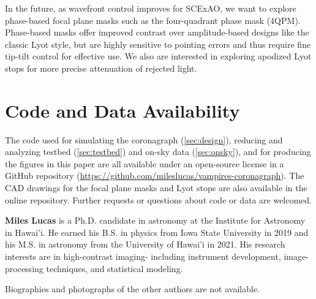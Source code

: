 \documentclass[12pt]{spieman}  %
\begin{document}
\begin{spacing}{2}
In the future, as wavefront control improves for SCExAO, we want to explore phase-based focal plane masks such as the four-quadrant phase mask (4QPM)\cite{rouanFourQuadrantPhase2007}. Phase-based masks offer improved contrast over amplitude-based designs like the classic Lyot style, but are highly sensitive to pointing errors and thus require fine tip-tilt control for effective use\cite{huby2017}. We also are interested in exploring apodized Lyot stops for more precise attenuation of rejected light.

\section*{Code and Data Availability}\label{sec:code}

The code used for simulating the coronagraph (\autoref{sec:design}), reducing and analyzing testbed (\autoref{sec:testbed}) and on-sky data (\autoref{sec:onsky}), and for producing the figures in this paper are all available under an open-source license in a GitHub repository (\url{https://github.com/mileslucas/vampires-coronagraph}). The CAD drawings for the focal plane masks and Lyot stops are also available in the online repository. Further requests or questions about code or data are welcomed.




\vspace{2ex}\noindent\textbf{Miles Lucas} is a Ph.D. candidate in astronomy at the Institute for Astronomy in Hawai'i. He earned his B.S. in physics from Iowa State University in 2019 and his M.S. in astronomy from the University of Hawai'i in 2021. His research interests are in high-contrast imaging- including instrument development, image-processing techniques, and statistical modeling.

\vspace{1ex}
\noindent Biographies and photographs of the other authors are not available.

\listoffigures
\listoftables

\end{spacing}
\end{document}
